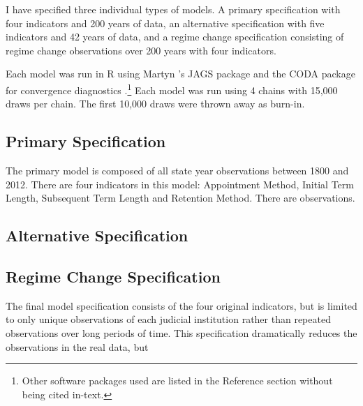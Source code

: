 \documentclass[JohnsonMADraft2]{subfiles}
\begin{document}
I have specified three individual types of models.  A primary specification with four indicators and 200 years of data, an alternative specification with five indicators and 42 years of data, and a regime change specification consisting of regime change observations over 200 years with four indicators.

Each model was run in R using Martyn \citeauthor{rjags}'s JAGS package and the CODA package for convergence diagnostics \cite{R,CODA}.\footnote{Other software packages used are listed in the Reference section without being cited in-text.}\nocite{R,CODA,R-Foreign,R2jags,ggplot2,dplyr,rjags}  Each model was run using 4 chains with 15,000 draws per chain.  The first 10,000 draws were thrown away as burn-in.

\subsection*{Primary Specification}
The primary model is composed of all state year observations between 1800 and 2012.  There are four indicators in this model: Appointment Method, Initial Term Length, Subsequent Term Length and Retention Method.  There are  observations.  

\subsection*{Alternative Specification}


\subsection*{Regime Change Specification}
The final model specification consists of the four original indicators, but is limited to only unique observations of each judicial institution rather than repeated observations over long periods of time.  This specification dramatically reduces the observations in the real data, but 

%
%	
\end{document}

